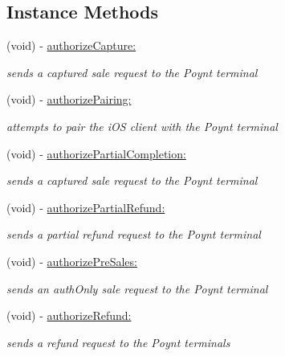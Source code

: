 \subsection*{Instance Methods}
\begin{DoxyCompactItemize}
\item 
(void) -\/ \hyperlink{interface_poynt_p_o_s_connection_manager_aa35b8ab75b2115f27c8363465b2f4c85}{authorize\+Capture\+:}
\begin{DoxyCompactList}\small\item\em sends a captured sale request to the Poynt terminal \end{DoxyCompactList}\item 
(void) -\/ \hyperlink{interface_poynt_p_o_s_connection_manager_a80bcfbd9a0d3d99af46027edee12d5ba}{authorize\+Pairing\+:}
\begin{DoxyCompactList}\small\item\em attempts to pair the i\+OS client with the Poynt terminal \end{DoxyCompactList}\item 
(void) -\/ \hyperlink{interface_poynt_p_o_s_connection_manager_a9ddd4dfbae869bf65611b03472140b8e}{authorize\+Partial\+Completion\+:}
\begin{DoxyCompactList}\small\item\em sends a captured sale request to the Poynt terminal \end{DoxyCompactList}\item 
(void) -\/ \hyperlink{interface_poynt_p_o_s_connection_manager_a165211f19736758772a4427902bdb932}{authorize\+Partial\+Refund\+:}
\begin{DoxyCompactList}\small\item\em sends a partial refund request to the Poynt terminal \end{DoxyCompactList}\item 
(void) -\/ \hyperlink{interface_poynt_p_o_s_connection_manager_a3eb595755dc0ecbf9fa358f55117f021}{authorize\+Pre\+Sales\+:}
\begin{DoxyCompactList}\small\item\em sends an auth\+Only sale request to the Poynt terminal \end{DoxyCompactList}\item 
(void) -\/ \hyperlink{interface_poynt_p_o_s_connection_manager_a06494ca11a35277bc19c86dcfd34c8a4}{authorize\+Refund\+:}
\begin{DoxyCompactList}\small\item\em sends a refund request to the Poynt terminals \end{DoxyCompactList}\item 

\end{DoxyCompactItemize}
